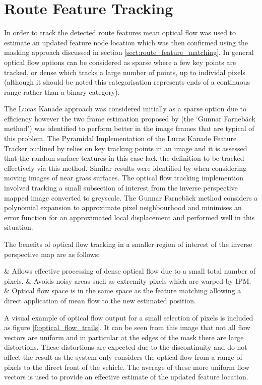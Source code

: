 \documentclass[]{aiaa-tc}%
\begin{document}
\section{Route Feature Tracking}\label{s:roadFeatureTracking}

In order to track the detected route features mean optical flow was used to estimate an updated feature node location which was then confirmed using the masking approach discussed in section \ref{sect:route_feature_matching}. In general optical flow options can be considered as sparse where a few key points are tracked, or dense which tracks a large number of points, up to individal pixels (although it should be noted this categorisation represents ends of a continuous range rather than a binary category). 

The Lucas Kanade approach was considered initially as a sparse option due to efficiency however the two frame estimation proposed by \citet{opticalFlowSolution} (the `Gunnar Farneb{\"a}ck method') was identified to perform better in the image frames that are typical of this problem. The Pyramidal Implementation of the Lucas Kanade Feature Tracker outlined by \citet{opticalFlowLKPyramidal} relies on key tracking points in an image and it is assessed that the random surface textures in this case lack the definition to be tracked effectively via this method. Similar results were identified by \citet{opticalFlowLKvsDenseUAV} when considering moving images of near grass surfaces. The optical flow tracking implemention involved tracking a small subsection of interest from the inverse perspective mapped image converted to greyscale. The Gunnar Farneb{\"a}ck method considers a polynomial expansion to approximate pixel neighbourhood and minimises an error function for an approximated local displacement and performed well in this situation.

The benefits of optical flow tracking in a smaller region of interest of the inverse perspective map are as follows:
\begin{easylist}
	& Allows effective processing of dense optical flow due to a small total number of pixels.
	& Avoids noisy areas such as extremity pixels which are warped by IPM.
	& Optical flow space is in the same space as the feature matching allowing a direct application of mean flow to the new estimated position.
\end{easylist}

A visual example of optical flow output for a small selection of pixels is included as figure \ref{f:optical_flow_trails}. It can be seen from this image that not all flow vectors are uniform and in particular at the edges of the mask there are large distortions. These distortions are expected due to the discontinuity and do not affect the result as the system only considers the optical flow from a range of pixels to the direct front of the vehicle. The average of these more uniform flow vectors is used to provide an effective estimate of the updated feature location.
\end{document}
